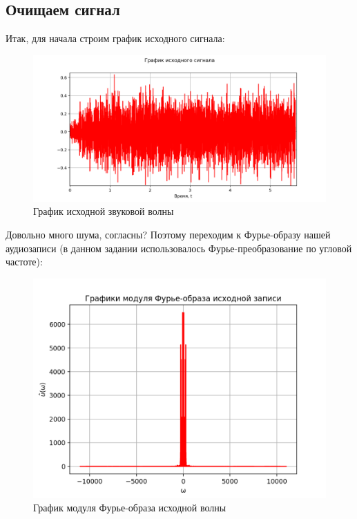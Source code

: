 \subsection{Очищаем сигнал}

Итак, для начала строим график исходного сигнала:

\begin{figure}[ht!]
    \centering
    \includegraphics[scale=0.5]{media/2 task/Source_Звуковая волна.png}
    \caption{График исходной звуковой волны}
    \label{fig:initial_wave}
\end{figure}

Довольно много шума, согласны? Поэтому переходим к Фурье-образу нашей аудиозаписи (в данном задании использовалось Фурье-преобразование по угловой частоте):

\begin{figure}[ht!]
    \centering
    \includegraphics[scale=0.6]{media/2 task/Image_Orig.png}
    \caption{График модуля Фурье-образа исходной волны}
    \label{fig:four_orig_wave}
\end{figure}

